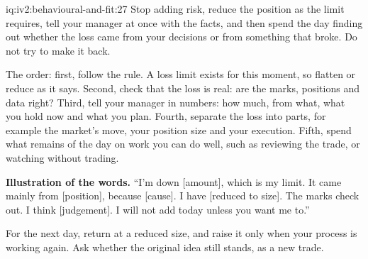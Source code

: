 \begin{solution}{iq:iv2:behavioural-and-fit:27}
Stop adding risk, reduce the position as the limit requires, tell your manager at once with the facts, and then spend the day finding out whether the loss came from your decisions or from something that broke. Do not try to make it back.

The order: first, follow the rule. A loss limit exists for this moment, so flatten or reduce as it says. Second, check that the loss is real: are the marks, positions and data right? Third, tell your manager in numbers: how much, from what, what you hold now and what you plan. Fourth, separate the loss into parts, for example the market's move, your position size and your execution. Fifth, spend what remains of the day on work you can do well, such as reviewing the trade, or watching without trading.

\textbf{Illustration of the words.} ``I'm down [amount], which is my limit. It came mainly from [position], because [cause]. I have [reduced to size]. The marks check out. I think [judgement]. I will not add today unless you want me to.''

For the next day, return at a reduced size, and raise it only when your process is working again. Ask whether the original idea still stands, as a new trade.

\end{solution}

